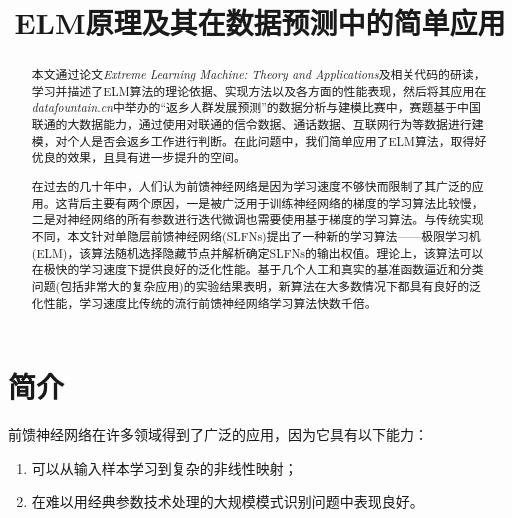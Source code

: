\documentclass[conference]{IEEEtran}
\begin{document}
	
\pagestyle{mystyle}

\title{ELM原理及其在数据预测中的简单应用}

\author{
}

\maketitle

\begin{abstract}
	本文通过论文\textit{Extreme Learning Machine: Theory and Applications}\cite{elm:huang}及相关代码的研读，学习并描述了ELM算法的理论依据、实现方法以及各方面的性能表现，然后将其应用在\textit{datafountain.cn}中举办的“返乡人群发展预测”的数据分析与建模比赛中，赛题基于中国联通的大数据能力，通过使用对联通的信令数据、通话数据、互联网行为等数据进行建模，对个人是否会返乡工作进行判断。在此问题中，我们简单应用了ELM算法，取得好优良的效果，且具有进一步提升的空间。
	
	在过去的几十年中，人们认为前馈神经网络是因为学习速度不够快而限制了其广泛的应用。这背后主要有两个原因，一是被广泛用于训练神经网络的梯度的学习算法比较慢，二是对神经网络的所有参数进行迭代微调也需要使用基于梯度的学习算法。与传统实现不同，本文针对单隐层前馈神经网络(SLFNs)提出了一种新的学习算法——极限学习机(ELM)，该算法随机选择隐藏节点并解析确定SLFNs的输出权值。理论上，该算法可以在极快的学习速度下提供良好的泛化性能。基于几个人工和真实的基准函数逼近和分类问题(包括非常大的复杂应用)的实验结果表明，新算法在大多数情况下都具有良好的泛化性能，学习速度比传统的流行前馈神经网络学习算法快数千倍。
\end{abstract}


\section{简介}

前馈神经网络在许多领域得到了广泛的应用，因为它具有以下能力：
\begin{enumerate}
	\item 可以从输入样本学习到复杂的非线性映射；
	\item 在难以用经典参数技术处理的大规模模式识别问题中表现良好。
\end{enumerate}
\end{document}
